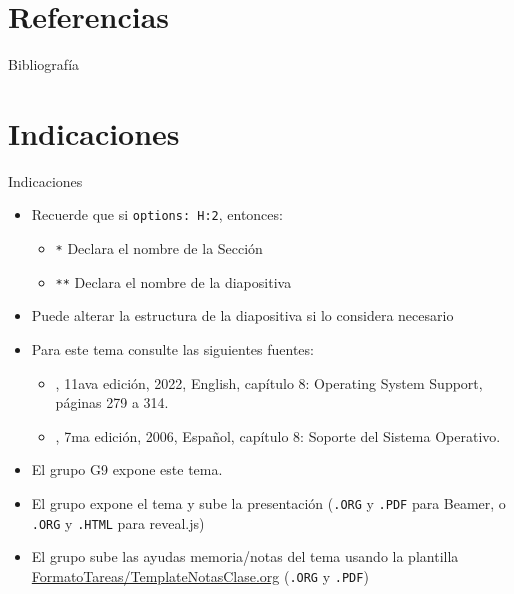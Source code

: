 \documentclass[presentation]{beamer}
\begin{document}
\section{Referencias}
\label{sec:org4e722f7}
\begin{frame}[allowframebreaks]{Bibliografía}
\printbibliography
\end{frame}

\section{Indicaciones}
\label{sec:org362f909}
\begin{frame}{Indicaciones}
 \begin{itemize}
\item Recuerde que si \texttt{options: H:2}, entonces:
\begin{itemize}
\item \texttt{*} Declara el nombre de la Sección
\item \texttt{**} Declara el nombre de la diapositiva
\end{itemize}
\item Puede alterar la estructura de la diapositiva si lo considera necesario
\item Para este tema consulte las siguientes fuentes:
\begin{itemize}
\item \textcite{stallings2022computer}, 11ava edición, 2022, English,
capítulo 8: Operating System Support, páginas 279 a 314.
\item \textcite{stallings2006esp}, 7ma edición, 2006, Español,
capítulo 8: Soporte del Sistema Operativo.
\end{itemize}
\item El grupo G9 expone este tema.
\item El grupo expone el tema y sube la presentación (\texttt{.ORG} y \texttt{.PDF} para Beamer, o \texttt{.ORG} y \texttt{.HTML} para reveal.js)
\item El grupo sube las ayudas memoria/notas del tema usando la plantilla \url{FormatoTareas/TemplateNotasClase.org} (\texttt{.ORG} y \texttt{.PDF})
\end{itemize}
\end{frame}
\end{document}
